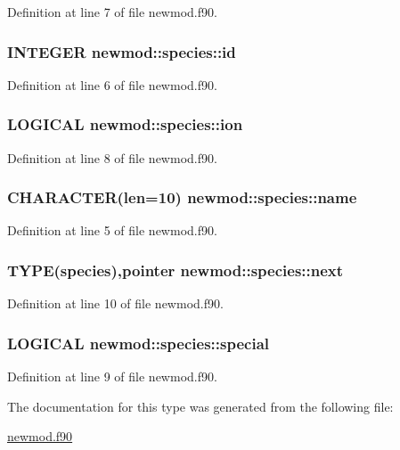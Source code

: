 Definition at line 7 of file newmod.f90.\hypertarget{typenewmod_1_1species_ac55cf0b1aada54d02291ca67eb452c21}{
\subsubsection[{id}]{\setlength{\rightskip}{0pt plus 5cm}INTEGER {\bf newmod::species::id}}}
\label{typenewmod_1_1species_ac55cf0b1aada54d02291ca67eb452c21}


Definition at line 6 of file newmod.f90.\hypertarget{typenewmod_1_1species_a4872477809d49fa74a0e59923c90098e}{
\subsubsection[{ion}]{\setlength{\rightskip}{0pt plus 5cm}LOGICAL {\bf newmod::species::ion}}}
\label{typenewmod_1_1species_a4872477809d49fa74a0e59923c90098e}


Definition at line 8 of file newmod.f90.\hypertarget{typenewmod_1_1species_aba486adbfaa2535487376bcd1b4ae198}{
\subsubsection[{name}]{\setlength{\rightskip}{0pt plus 5cm}CHARACTER(len=10) {\bf newmod::species::name}}}
\label{typenewmod_1_1species_aba486adbfaa2535487376bcd1b4ae198}


Definition at line 5 of file newmod.f90.\hypertarget{typenewmod_1_1species_a17af4c156b3b9bba9284d7de99183770}{
\subsubsection[{next}]{\setlength{\rightskip}{0pt plus 5cm}TYPE({\bf species}),pointer {\bf newmod::species::next}}}
\label{typenewmod_1_1species_a17af4c156b3b9bba9284d7de99183770}


Definition at line 10 of file newmod.f90.\hypertarget{typenewmod_1_1species_ad08ea98c512c5034bb2f514fb8297dff}{
\subsubsection[{special}]{\setlength{\rightskip}{0pt plus 5cm}LOGICAL {\bf newmod::species::special}}}
\label{typenewmod_1_1species_ad08ea98c512c5034bb2f514fb8297dff}


Definition at line 9 of file newmod.f90.

The documentation for this type was generated from the following file:\begin{DoxyCompactItemize}
\item 
\hyperlink{newmod_8f90}{newmod.f90}\end{DoxyCompactItemize}
